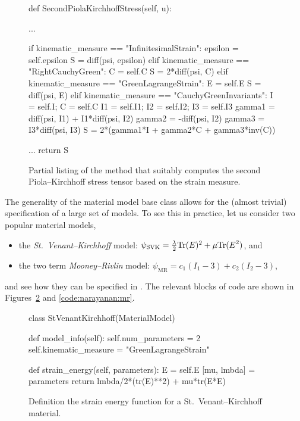 \begin{figure}[ht]
\begin{python}
def SecondPiolaKirchhoffStress(self, u):

  ...

  if kinematic_measure == "InfinitesimalStrain":
    epsilon = self.epsilon
    S = diff(psi, epsilon)
  elif kinematic_measure == "RightCauchyGreen":
    C = self.C
    S = 2*diff(psi, C)
  elif kinematic_measure == "GreenLagrangeStrain":
    E = self.E
    S = diff(psi, E)
  elif kinematic_measure == "CauchyGreenInvariants":
    I = self.I; C = self.C
    I1 = self.I1; I2 = self.I2; I3 = self.I3
    gamma1 = diff(psi, I1) + I1*diff(psi, I2)
    gamma2 = -diff(psi, I2)
    gamma3 = I3*diff(psi, I3)
    S = 2*(gamma1*I + gamma2*C + gamma3*inv(C))

  ...
  return S
\end{python}
\label{code:narayanan:material_model_base.py}
\caption{Partial listing of the method that suitably computes the
  second Piola--Kirchhoff stress tensor based on the strain measure.}
\end{figure}

The generality of the material model base class allows for the (almost
trivial) specification of a large set of models. To see this in
practice, let us consider two popular material models,

\begin{itemize}

\item the {\em St.~Venant--Kirchhoff} model:
$\psi_{\mathrm{SVK}} = \frac{\lambda}{2}\mathrm{Tr}(\mbox{$ E$})^{2} +
\mu\mathrm{Tr}(\mbox{$ E$}^{2})$, and
\item the two term {\em Mooney--Rivlin} model:
$\psi_{\mathrm{MR}} = c_{1} (I_{1} - 3) + c_{2} (I_{2} -
3)$,
\end{itemize}

\noindent and see how they can be specified in \twist. The relevant blocks of
code are shown in Figures~\ref{code:narayanan:svk} and
\ref{code:narayanan:mr}.

\begin{figure}[ht]
\begin{python}
class StVenantKirchhoff(MaterialModel)

  def model_info(self):
    self.num_parameters = 2
    self.kinematic_measure = "GreenLagrangeStrain"

  def strain_energy(self, parameters):
    E = self.E
    [mu, lmbda] = parameters
    return lmbda/2*(tr(E)**2) + mu*tr(E*E)
\end{python}
\caption{Definition the strain energy function for a
  St.~Venant--Kirchhoff material.}
\label{code:narayanan:svk}
\end{figure}

